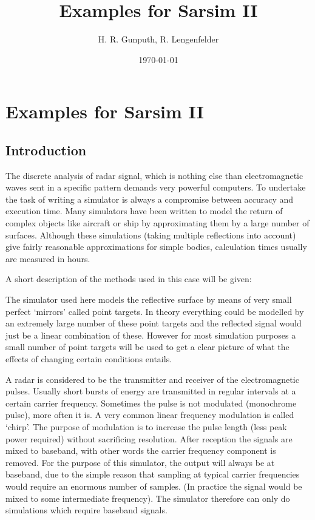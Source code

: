 \documentclass[thmsa,a4paper,ukenglish]{report}
\begin{document}
\author{H. R. Gunputh, R. Lengenfelder}
\title{Examples for Sarsim II}
\date{\today}

\chapter{Examples for Sarsim II}

\section{Introduction}

The discrete analysis of radar signal, which is nothing else than
electromagnetic waves sent in a specific pattern demands very powerful
computers. To undertake the task of writing a simulator is always a
compromise between accuracy and execution time. Many simulators have been
written to model the return of complex objects like aircraft or ship by
approximating them by a large number of surfaces. Although these simulations
(taking multiple reflections into account) give fairly reasonable
approximations for simple bodies, calculation times usually are measured in
hours.

A short description of the methods used in this case will be given:

The simulator used here models the reflective surface by means of very small
perfect `mirrors' called point targets. In theory everything could be
modelled by an extremely large number of these point targets and the
reflected signal would just be a linear combination of these. However for
most simulation purposes a small number of point targets will be used to get
a clear picture of what the effects of changing certain conditions entails.

A radar is considered to be the transmitter and receiver of the
electromagnetic pulses. Usually short bursts of energy are transmitted in
regular intervals at a certain carrier frequency. Sometimes the pulse is not
modulated (monochrome pulse), more often it is. A very common linear
frequency modulation is called `chirp'. The purpose of modulation is to
increase the pulse length (less peak power required) without sacrificing
resolution. After reception the signals are mixed to baseband, with other
words the carrier frequency component is removed. For the purpose of this
simulator, the output will always be at baseband, due to the simple reason
that sampling at typical carrier frequencies would require an enormous
number of samples. (In practice the signal would be mixed to some
intermediate frequency). The simulator therefore can only do simulations
which require baseband signals.
\end{document}
